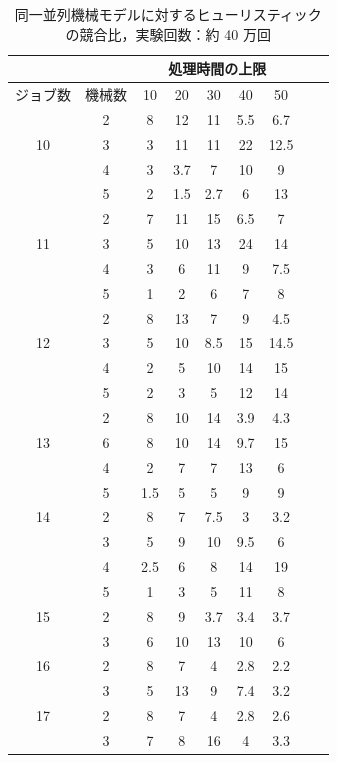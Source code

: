 \documentclass[12pt]{optlab-bachelor}
\begin{document}
\begin{table}[htb]
  \begin{center}
    \begin{tabular}{|c|c|c|c|c|c|c|c|c|} \hline
      &  & \multicolumn{5}{c|}{処理時間の上限} \\ \hline
      ジョブ数 & 機械数& 10 & 20 & 30 & 40 & 50 \\ \hline \hline
      & 2 & 8 & 12 & 11 & 5.5 & 6.7   \\ \cline{2-7}
      10 & 3 & 3 & 11 & 11 & 22 & 12.5   \\ \cline{2-7}
      & 4 & 3 & 3.7 & 7 & 10 &  9  \\ \cline{2-7}
      & 5 & 2 & 1.5 & 2.7 & 6 & 13   \\ \hline \hline

      & 2 & 7 & 11 & 15 & 6.5 & 7   \\ \cline{2-7}
      11 & 3 & 5 & 10 & 13 & 24 & 14 \\ \cline{2-7}
      & 4 & 3 & 6 & 11 & 9 & 7.5   \\ \cline{2-7}
      & 5 & 1 & 2 & 6 & 7 & 8   \\ \hline \hline

      & 2 & 8 & 13 & 7 & 9 & 4.5   \\ \cline{2-7}
      12 & 3 & 5 & 10 & 8.5 & 15 & 14.5 \\ \cline{2-7}
      & 4 & 2 & 5 & 10 & 14 & 15   \\ \cline{2-7}
      & 5 & 2 & 3 & 5 & 12 & 14  \\ \hline \hline

      & 2 & 8 & 10 & 14 & 3.9 & 4.3 \\ \cline{2-7}
      13 & 6 & 8 & 10 & 14 & 9.7 & 15 \\ \cline{2-7}
      & 4 & 2 & 7 & 7 & 13 & 6 \\ \cline{2-7}
      & 5 & 1.5 & 5 & 5 & 9 & 9 \\ \hline \hline

      14 & 2 & 8 & 7 & 7.5 & 3 & 3.2 \\ \cline{2-7}
      & 3 & 5 & 9 & 10 & 9.5 & 6 \\ \cline{2-7}
      & 4 & 2.5 & 6 & 8 & 14 & 19  \\ \cline{2-7}
      & 5 & 1 & 3 & 5 & 11 & 8 \\ \hline \hline

      15 & 2 & 8 & 9 & 3.7 & 3.4 & 3.7 \\ \cline{2-7}
      & 3 & 6 & 10 & 13 & 10 & 6 \\ \hline \hline

      16 & 2 & 8 & 7 & 4 & 2.8 & 2.2 \\ \cline{2-7}
      & 3 & 5 & 13 & 9 & 7.4 & 3.2 \\ \hline \hline

      17 & 2 & 8 & 7 & 4 & 2.8 & 2.6 \\ \cline{2-7}
      & 3 & 7 & 8 & 16 & 4 & 3.3 \\ \hline \hline
    \end{tabular}
    \caption{同一並列機械モデルに対するヒューリスティックの競合比，実験回数：約 40 万回}
    \label{A5}
  \end{center}
\end{table}
\end{document}
